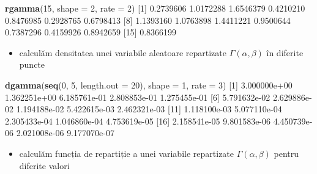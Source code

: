 \documentclass[]{article}
\newenvironment{Shaded}{\begin{snugshade}}{\end{snugshade}}
\newcommand{\KeywordTok}[1]{\textcolor[rgb]{0.13,0.29,0.53}{\textbf{#1}}}
\newcommand{\DataTypeTok}[1]{\textcolor[rgb]{0.13,0.29,0.53}{#1}}
\newcommand{\DecValTok}[1]{\textcolor[rgb]{0.00,0.00,0.81}{#1}}
\newcommand{\FloatTok}[1]{\textcolor[rgb]{0.00,0.00,0.81}{#1}}
\newcommand{\NormalTok}[1]{#1}
\providecommand{\tightlist}{%
  \setlength{\itemsep}{0pt}\setlength{\parskip}{0pt}}
\begin{document}
\begin{Shaded}
\begin{Highlighting}[]
\KeywordTok{rgamma}\NormalTok{(}\DecValTok{15}\NormalTok{, }\DataTypeTok{shape =} \DecValTok{2}\NormalTok{, }\DataTypeTok{rate =} \DecValTok{2}\NormalTok{)}
\NormalTok{ [}\DecValTok{1}\NormalTok{] }\FloatTok{0.2739606} \FloatTok{1.0172288} \FloatTok{1.6546379} \FloatTok{0.4210210} \FloatTok{0.8476985} \FloatTok{0.2928765} \FloatTok{0.6798413}
\NormalTok{ [}\DecValTok{8}\NormalTok{] }\FloatTok{1.1393160} \FloatTok{1.0763898} \FloatTok{1.4411221} \FloatTok{0.9500644} \FloatTok{0.7387296} \FloatTok{0.4159926} \FloatTok{0.8942659}
\NormalTok{[}\DecValTok{15}\NormalTok{] }\FloatTok{0.8366199}
\end{Highlighting}
\end{Shaded}

\begin{itemize}
\tightlist
\item
  calculăm densitatea unei variabile aleatoare repartizate
  \(\Gamma(\alpha, \beta)\) în diferite puncte
\end{itemize}

\begin{Shaded}
\begin{Highlighting}[]
\KeywordTok{dgamma}\NormalTok{(}\KeywordTok{seq}\NormalTok{(}\DecValTok{0}\NormalTok{, }\DecValTok{5}\NormalTok{, }\DataTypeTok{length.out =} \DecValTok{20}\NormalTok{), }\DataTypeTok{shape =} \DecValTok{1}\NormalTok{, }\DataTypeTok{rate =} \DecValTok{3}\NormalTok{)}
\NormalTok{ [}\DecValTok{1}\NormalTok{] }\FloatTok{3.000000e+00} \FloatTok{1.362251e+00} \FloatTok{6.185761e-01} \FloatTok{2.808853e-01} \FloatTok{1.275455e-01}
\NormalTok{ [}\DecValTok{6}\NormalTok{] }\FloatTok{5.791632e-02} \FloatTok{2.629886e-02} \FloatTok{1.194188e-02} \FloatTok{5.422615e-03} \FloatTok{2.462321e-03}
\NormalTok{[}\DecValTok{11}\NormalTok{] }\FloatTok{1.118100e-03} \FloatTok{5.077110e-04} \FloatTok{2.305433e-04} \FloatTok{1.046860e-04} \FloatTok{4.753619e-05}
\NormalTok{[}\DecValTok{16}\NormalTok{] }\FloatTok{2.158541e-05} \FloatTok{9.801583e-06} \FloatTok{4.450739e-06} \FloatTok{2.021008e-06} \FloatTok{9.177070e-07}
\end{Highlighting}
\end{Shaded}

\begin{itemize}
\tightlist
\item
  calculăm funcția de repartiție a unei variabile repartizate
  \(\Gamma(\alpha, \beta)\) pentru diferite valori
\end{itemize}
\end{document}
